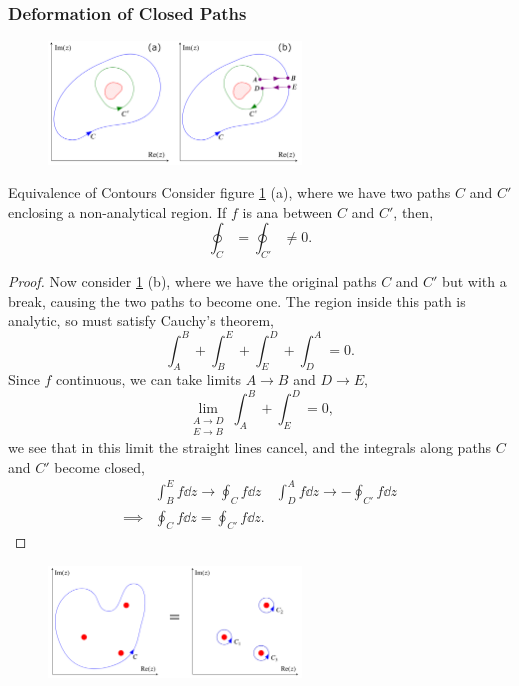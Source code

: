 \documentclass{book}
\begin{document}
\subsubsection{Deformation of Closed Paths}
\begin{figure}[h]
	\centering
	\includegraphics[width=0.6\textwidth]{closed.png}
	\caption{}
	\label{fig:closed}
\end{figure}
\begin{Theorems}{Equivalence of Contours}{}
	Consider figure \ref{fig:closed} (a), where we have two paths $C$ and $C'$ enclosing a non-analytical region. If $f$ is ana between $C$ and $C'$, then,
	\begin{equation}
		\oint_C = \oint_{C'} \neq 0.
	\end{equation}
\end{Theorems}
\begin{proof}
	Now consider \ref{fig:closed} (b), where we have the original paths $C$ and $C'$ but with a break, causing the two paths to become one. The region inside this path is analytic, so must satisfy Cauchy's theorem,
	\begin{equation}
		\int_A^B +\int_B^E + \int_E^D + \int_D^A = 0.
	\end{equation}
	Since $f$ continuous, we can take limits $A \to B$ and $D \to E$,
	\begin{equation}
		\lim_{\substack{A \to D \\ E \to B}} \int_A^B + \int_E^D = 0,
	\end{equation}
	we see that in this limit the straight lines cancel, and the integrals along paths $C$ and $C'$ become closed,
	\begin{align}
		&\int_B^E f\dd{z} \to \oint_C f\dd{z} & \int_D^A f\dd{z} \to -\oint_{C'}f\dd{z} \\
		\implies & \oint_Cf\dd{z} = \oint_{C'} f\dd{z}.
	\end{align}
\end{proof}
\begin{figure}
	\centering
	\includegraphics[width=0.6\textwidth]{sing.png}
	\caption{}
	\label{fig:sing}
\end{figure}
\end{document}
